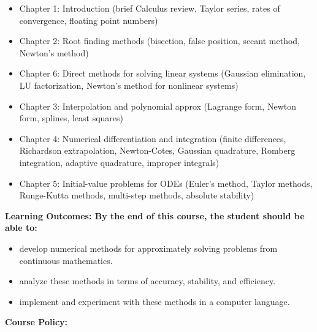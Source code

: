 \documentclass [10pt]{article}
\begin{document}
\begin{itemize}
\setlength{\itemsep}{1pt}
\setlength{\parskip}{0pt}
\setlength{\parsep}{0pt}
\item Chapter 1: Introduction (brief Calculus review, Taylor series, rates of convergence, floating point numbers) 
\item Chapter 2: Root finding methods (bisection, false position, secant method, Newton's method)
\item Chapter 6: Direct methods for solving linear systems (Gaussian elimination, LU factorization, Newton's method for nonlinear systems)
\item Chapter 3: Interpolation and polynomial approx (Lagrange form, Newton form, splines, least squares)
\item Chapter 4: Numerical differentiation and integration (finite differences, Richardson extrapolation, Newton-Cotes, Gaussian quadrature, Romberg integration, adaptive quadrature, improper integrals)
\item Chapter 5: Initial-value problems for ODEs (Euler's method, Taylor methods, Runge-Kutta methods, multi-step methods, absolute stability)
\end{itemize}
\noindent
\bfseries Learning Outcomes: \normalfont By the end of this course, the student should be able to: \vspace{-3mm} 
\begin {itemize}
\setlength{\itemsep}{1pt}
\setlength{\parskip}{0pt}
\setlength{\parsep}{0pt}
\item develop numerical methods for approximately solving problems from continuous mathematics.
\item analyze these methods in terms of accuracy, stability, and efficiency.
\item implement and experiment with these methods in a computer language.
\end{itemize}
\noindent
\bfseries Course Policy: \normalfont \vspace{-3mm} 
\end{document}
